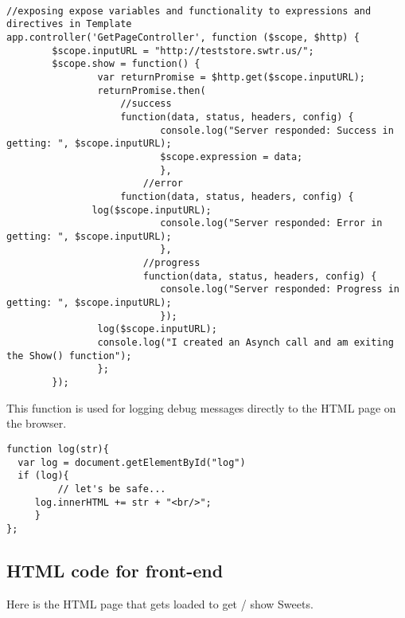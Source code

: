 \documentclass[11pt]{article}
\begin{document}
\begin{verbatim}

//exposing expose variables and functionality to expressions and directives in Template
app.controller('GetPageController', function ($scope, $http) { 
        $scope.inputURL = "http://teststore.swtr.us/";
        $scope.show = function() {
                var returnPromise = $http.get($scope.inputURL);
                returnPromise.then(
                    //success
                    function(data, status, headers, config) {
                           console.log("Server responded: Success in getting: ", $scope.inputURL);      
                           $scope.expression = data;
                           },
                        //error   
                    function(data, status, headers, config) {
               log($scope.inputURL);            
                           console.log("Server responded: Error in getting: ", $scope.inputURL);
                           },
                        //progress   
                        function(data, status, headers, config) {
                           console.log("Server responded: Progress in getting: ", $scope.inputURL);     
                           });
                log($scope.inputURL);      
                console.log("I created an Asynch call and am exiting the Show() function");     
                };
        });
\end{verbatim}

This function is used for logging debug messages directly to the HTML
page on the browser. 

\begin{verbatim}
function log(str){
  var log = document.getElementById("log")
  if (log){ 
         // let's be safe...
     log.innerHTML += str + "<br/>";
     }
};
\end{verbatim}
\subsection{HTML code for front-end}
\label{sec-8-2}

Here is the HTML page that gets loaded to get / show Sweets.
\end{document}
